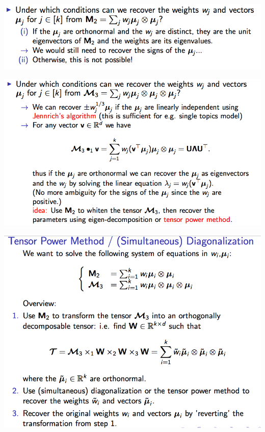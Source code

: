 \includegraphics[width=\linewidth]{tensor_decomp.png}

\includegraphics[width=\linewidth]{tensor_decomp_2.png}

\includegraphics[width=\linewidth]{tensor_decomp_3.png}




